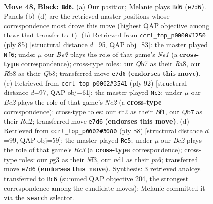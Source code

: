 \documentclass[11pt]{article}
\begin{document}
\clearpage

\begin{figure}[p]\centering
\begin{subfigure}{0.46\textwidth}\centering
\resizebox{\linewidth}{!}{%
\newchessgame
\chessboard[
  setfen={nr4k1/1q2b1n1/p4r2/P1p2p1p/3p1Pp1/1P4P1/QRNBP2P/R2N2K1 b - - 13 48},
  showmover=false,
  pgfstyle=straightmove, color=movearrow, markmove={e7-d6}
]}
\caption{}
\end{subfigure}\hfill
\begin{subfigure}{0.46\textwidth}\centering
\resizebox{\linewidth}{!}{%
\newchessgame
\chessboard[
  setfen={bqr1n1k1/5pp1/rp1pp2p/8/1PPNPP2/1Q3B1P/2R3P1/3R3K b - - 32 43},
  showmover=false,
  pgfstyle=straightmove, color=movearrow, markmove={e8-f6}
]}
\caption{}
\end{subfigure}
\\[4pt]
\begin{subfigure}{0.46\textwidth}\centering
\resizebox{\linewidth}{!}{%
\newchessgame
\chessboard[
  setfen={br1rq3/4bppk/3p2np/1p2p3/1P2P3/PQ3PBP/3RN1P1/3R1B1K w - - 0 47},
  showmover=false,
  pgfstyle=straightmove, color=movearrow, markmove={e2-c3}
]}
\caption{}
\end{subfigure}\hfill
\begin{subfigure}{0.46\textwidth}\centering
\resizebox{\linewidth}{!}{%
\newchessgame
\chessboard[
  setfen={3r3k/1p1r1qp1/pnp1pp1p/8/PP1PP2P/1QR2NP1/5PK1/4R3 w - - 6 45},
  showmover=false,
  pgfstyle=straightmove, color=movearrow, markmove={c3-c5}
]}
\caption{}
\end{subfigure}
\caption{\textbf{Move 48, Black: \texttt{Bd6}.} (a) Our position; Melanie plays \texttt{Bd6} (\texttt{e7d6}). Panels (b)--(d) are the retrieved master positions whose correspondence most drove this move (highest QAP objective among those that transfer to it). (b) Retrieved from \texttt{ccrl\_top\_p0000\#1250} (ply 85) [structural distance $d$=95, QAP obj=83]: the master played \texttt{Nf6}; under $\mu$ our \emph{Be2} plays the role of that game's \emph{Ne1} (a \textbf{cross-type} correspondence); cross-type roles: our \emph{Q}b7 as their \emph{B}a8, our \emph{R}b8 as their \emph{Q}b8; transferred move \texttt{e7d6} \textbf{(endorses this move)}. (c) Retrieved from \texttt{ccrl\_top\_p0002\#3541} (ply 92) [structural distance $d$=97, QAP obj=61]: the master played \texttt{Nc3}; under $\mu$ our \emph{Be2} plays the role of that game's \emph{Ne2} (a \textbf{cross-type} correspondence); cross-type roles: our \emph{r}b2 as their \emph{B}f1, our \emph{Q}b7 as their \emph{R}d2; transferred move \texttt{e7d6} \textbf{(endorses this move)}. (d) Retrieved from \texttt{ccrl\_top\_p0002\#3080} (ply 88) [structural distance $d$=99, QAP obj=59]: the master played \texttt{Rc5}; under $\mu$ our \emph{Be2} plays the role of that game's \emph{Rc3} (a \textbf{cross-type} correspondence); cross-type roles: our \emph{p}g3 as their \emph{N}f3, our \emph{n}d1 as their \emph{p}a6; transferred move \texttt{e7d6} \textbf{(endorses this move)}. Synthesis: 3 retrieved analogs transferred to \texttt{Bd6} (summed QAP objective 204, the strongest correspondence among the candidate moves); Melanie committed it via the \texttt{search} selector.}
\label{fig:thought-m95}
\end{figure}
\end{document}
